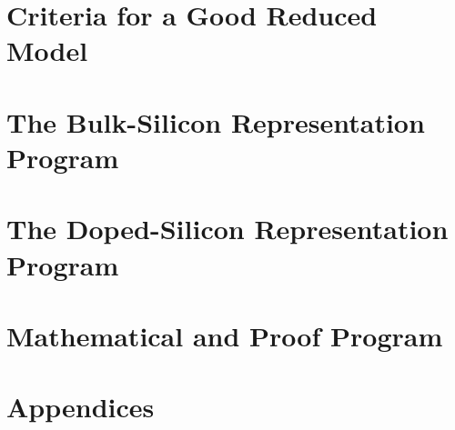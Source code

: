 \documentclass[12pt,oneside]{report}
\theoremstyle{monographplain}
\theoremstyle{monographdefinition}
\begin{document}
\clearpage
\hypersetup{pageanchor=true}
\pagestyle{monograph}

\tableofcontents
\clearpage
{}

\part{Criteria for a Good Reduced Model}




\part{The Bulk-Silicon Representation Program}






\part{The Doped-Silicon Representation Program}








\part{Mathematical and Proof Program}







\appendix
\part*{Appendices}













{\RaggedRight
\hfuzz=0.2pt
\printbibliography[title={References}]
}
\printindex
\end{document}

